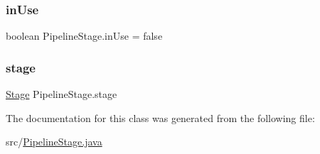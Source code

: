 \mbox{\label{class_pipeline_stage_a3ac73b767158fba9e6875514845d1d97}} 
\subsubsection{\texorpdfstring{in\+Use}{inUse}}
{\footnotesize\ttfamily boolean Pipeline\+Stage.\+in\+Use = false\hspace{0.3cm}{\ttfamily [private]}}

\mbox{\label{class_pipeline_stage_a8e9a5f7315a4d88213c4ad0949048f34}} 
\subsubsection{\texorpdfstring{stage}{stage}}
{\footnotesize\ttfamily \mbox{\hyperlink{enum_stage}{Stage}} Pipeline\+Stage.\+stage\hspace{0.3cm}{\ttfamily [private]}}



The documentation for this class was generated from the following file\+:\begin{DoxyCompactItemize}
\item 
src/\mbox{\hyperlink{_pipeline_stage_8java}{Pipeline\+Stage.\+java}}\end{DoxyCompactItemize}
